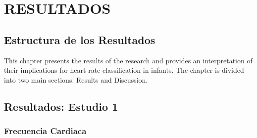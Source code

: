 \section{RESULTADOS}\label{cap:resultsANDdiscussion}

\subsection{Estructura de los Resultados}\label{sec:results}

This chapter presents the results of the research and provides an interpretation of their implications for heart rate classification in infants. The chapter is divided into two main sections: Results and Discussion.

\subsection{Resultados: Estudio 1}\label{sec:resultados-estudio-1}

\subsubsection{Frecuencia Cardiaca}

